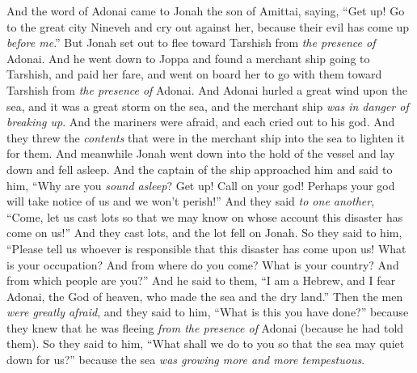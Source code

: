 
\begin{biblechapter} %
 And the word of Adonai came to Jonah the son of Amittai, saying,
\verse “Get up! Go to the great city Nineveh and cry out against her, because their evil has come up \textit{before me}.”
\verse But Jonah set out to flee toward Tarshish from \textit{the presence of} Adonai. And he went down to Joppa and found a merchant ship going to Tarshish, and paid her fare, and went on board her to go with them toward Tarshish from \textit{the presence of} Adonai.
\verse And Adonai hurled a great wind upon the sea, and it was a great storm on the sea, and the merchant ship \textit{was in danger of breaking up}.
\verse And the mariners were afraid, and each cried out to his god. And they threw the \textit{contents} that were in the merchant ship into the sea to lighten it for them. And meanwhile Jonah went down into the hold of the vessel and lay down and fell asleep.
\verse And the captain of the ship approached him and said to him, “Why are you \textit{sound asleep}? Get up! Call on your god! Perhaps your god will take notice of us and we won’t perish!”
\verse And they said \textit{to one another}, “Come, let us cast lots so that we may know on whose account this disaster has come on us!” And they cast lots, and the lot fell on Jonah.
\verse So they said to him, “Please tell us whoever is responsible that this disaster has come upon us! What is your occupation? And from where do you come? What is your country? And from which people are you?”
\verse And he said to them, “I am a Hebrew, and I fear Adonai, the God of heaven, who made the sea and the dry land.”
\verse Then the men \textit{were greatly afraid}, and they said to him, “What is this you have done?” because they knew that he was fleeing \textit{from the presence of} Adonai (because he had told them).
\verse So they said to him, “What shall we do to you so that the sea may quiet down for us?” because the sea \textit{was growing more and more tempestuous}.

\end{biblechapter}
